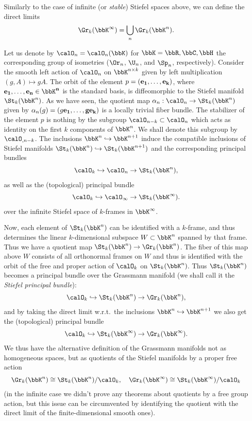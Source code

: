 \begin{defn}
    Similarly to the case of infinite (or \emph{stable}) Stiefel spaces above, we can define the direct limits
    \[\Gr_k(\bbK^\infty)=\bigcup_n \Gr_k(\bbK^n).\]
\end{defn}

Let us denote by $\calO_n=\calO_n(\bbK)$ for $\bbK=\bbR,\bbC,\bbH$ the corresponding group of isometries ($\Or_n$, $\U_n$, and $\Sp_n$, respectively). Consider the smooth left action of $\calO_n$ on $\bbK^{n\times k}$ given by left multiplication $(g,A)\mapsto gA$. The orbit of the element $p=(\bf{e}_1,\ldots,\bf{e}_k)$, where $\bf{e}_1,\ldots,\bf{e}_n\in\bbK^n$ is the standard basis, is diffeomorphic to the Stiefel manifold $\St_k(\bbK^n)$. As we have seen, the quotient map $\alpha_n:\calO_n\to \St_k(\bbK^n)$ given by $\alpha_n(g)=(g\bf{e}_1,\ldots,g\bf{e}_k)$ is a locally trivial fiber bundle. The stabilizer of the element $p$ is nothing by the subgroup $\calO_{n-k}\subset \calO_n$ which acts as identity on the first $k$ components of $\bbK^n$. We shall denote this subgroup by $\calO_{,n-k}$. The inclusions $\bbK^n\hookrightarrow \bbK^{n+1}$ induce the compatible inclusions  of Stiefel manifolds $\St_k(\bbK^n)\hookrightarrow \St_k(\bbK^{n+1})$ and the corresponding principal bundles
\[\calO_k\hookrightarrow \calO_n\to \St_k(\bbK^n),\]
as well as the (topological) principal bundle
\[\calO_k\hookrightarrow \calO_\infty\to \St_k(\bbK^\infty).\]
over the infinite Stiefel space of $k$-frames in $\bbK^\infty$.

Now, each element of $\St_k(\bbK^n)$ can be identified with a $k$-frame, and thus determines the linear $k$-dimensional subspace $W\subset \bbK^n$ spanned by that frame. Thus we have a quotient map $\St_k(\bbK^n)\to \Gr_k(\bbK^n)$. The fiber of this map above $W$ consists of all orthonormal frames on $W$ and thus is identified with the orbit of the free and proper action of $\calO_k$ on $\St_k(\bbK^n)$. Thus $\St_k(\bbK^n)$ becomes a principal bundle over the Grassmann manifold (we shall call it the \emph{Stiefel principal bundle}):
\[\calO_k\hookrightarrow \St_k(\bbK^n)\to \Gr_k(\bbK^n),\label{eq Stiefel pfb}\]
and by taking the direct limit w.r.t.\ the inclusions $\bbK^n\hookrightarrow \bbK^{n+1}$ we also get the (topological) principal bundle
\[\calO_k\hookrightarrow \St_k(\bbK^\infty)\to \Gr_k(\bbK^\infty).\]
We thus have the alternative definition of the Grassmann manifolds not as homogeneous spaces, but as quotients of the Stiefel manifolds by a proper free action
\[\Gr_k(\bbK^n)\cong \St_k(\bbK^n)\slash \calO_k, \quad \Gr_k(\bbK^\infty)\cong \St_k(\bbK^\infty)\slash \calO_k\]
(in the infinite case we didn't prove any theorems about quotients by a free group action, but this issue can be circumvented by identifying the quotient with the direct limit of the finite-dimensional smooth ones).

